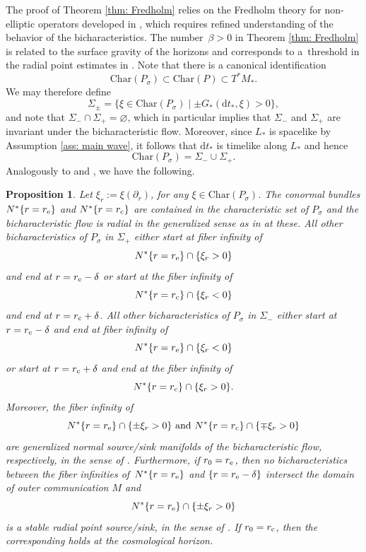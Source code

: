 \documentclass[10pt,a4paper]{amsart}
\renewcommand{\S}{\Sigma}
\newcommand{\de}{\delta}
\renewcommand{\b}{\beta}
\renewcommand{\d}{\partial}
\newcommand{\md}{\mathrm d}
\newcommand{\Char}{\mathrm{Char}}
\newcommand{\s}{\sigma}
\numberwithin{equation}{section}
\newtheorem{Proposition}[Theorem]{Proposition}
 { \theoremstyle{definition}
\newtheorem{Definition}[Theorem]{Definition}
\newtheorem{Note}[Theorem]{Note}
\newtheorem{Example}[Theorem]{Example}
\newtheorem{Remark}[Theorem]{Remark} }
\begin{document}
The proof of Theorem \ref{thm: Fredholm} relies on the Fredholm theory for non-elliptic operators developed in \cite{V2013}, which requires refined understanding of the behavior of the bicharacteristics.
The number~${\b > 0}$ in Theorem \ref{thm: Fredholm} is related to the surface gravity of the horizons and corresponds to a~threshold in the radial point estimates in \cite{V2013}.
Note that there is a canonical identification
\[
	\Char(P_\s)
		\subset \Char(P)
		\subset T^*M_*.
\]
We may therefore define
\[
	\S_\pm
		= \{ \xi \in \Char(P_\s) \mid \pm G_*(\md t_*, \xi) > 0 \},
\]
and note that $\S_- \cap \S_+ = \varnothing$, which in particular implies that $\S_-$ and $\S_+$ are invariant under the bicharacteristic flow.
Moreover, since $L_*$ is spacelike by Assumption \ref{ass: main wave}, it follows that $\md t_*$ is timelike along $L_*$ and hence
\[
	\Char(P_\s)
		= \S_- \cup \S_+.
\]
Analogously to \cite[Lemma~2.5]{PV2023} and \cite[Section~6]{V2013}, we have the following.
\begin{Proposition} \label{prop: classical radial points}
Let $\xi_r
		:= \xi(\d_r)$,
for any $\xi \in \Char(P_\s)$.
The conormal bundles $N^*\{r = r_{\rm e}\}$ and $N^*\{r = r_{\rm c}\}$ are contained in the characteristic set of $P_\s$ and the bicharacteristic flow is radial in the generalized sense as in {\rm\cite{V2013}} at these.
All other bicharacteristics of $P_\s$ in $\S_+$ either start at fiber infinity of
\[
	N^*\{r = r_{\rm e}\} \cap \{\xi_r > 0\}
\]
and end at $r = r_{\rm e} - \de$ or start at the fiber infinity of
\[
	N^*\{r = r_{\rm c}\} \cap \{\xi_r < 0\}
\]
and end at $r = r_{\rm c} + \de$.
All other bicharacteristics of $P_\s$ in $\S_-$ either start at $r = r_{\rm e} - \de$ and end at fiber infinity of
\[
	N^*\{r = r_{\rm e}\} \cap \{\xi_r < 0\}
\]
or start at $r = r_{\rm c} + \de$ and end at the fiber infinity of
\[
	N^*\{r = r_{\rm c}\} \cap \{\xi_r > 0\}.
\]
Moreover, the fiber infinity of
\[
	N^*\{r = r_{\rm e}\} \cap \{\pm \xi_r > 0\} \text{ and } N^*\{r = r_{\rm c}\} \cap \{\mp \xi_r > 0\}
\]
are generalized normal source/sink manifolds of the bicharacteristic flow, respectively, in the sense of {\rm\cite{V2013}}.
Furthermore, if $r_0 = r_{\rm e}$, then no bicharacteristics between the fiber infinities of~${N^*\{r = r_{\rm e}\}}$ and $\{r = r_{\rm e} - \de\}$ intersect the domain of outer communication $M$ and
\[N^*\{r = r_{\rm e}\} \cap \{\pm \xi_r > 0\}\]
 is a stable radial point source/sink, in the sense of {\rm\cite{V2013}}.
If $r_0 = r_{\rm c}$, then the corresponding holds at the cosmological horizon.
\end{Proposition}
\end{document}
